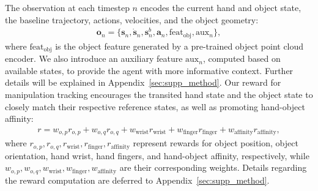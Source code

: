 The observation at each timestep $n$ encodes the current hand and object state, the baseline trajectory, actions, velocities, and the object geometry:
\begin{align}
    \mathbf{o}_n = \{ \mathbf{s}_n, \dot{\mathbf{s}}_n, \mathbf{s}^b_n, \mathbf{a}_n, \text{feat}_{\text{obj}}, \text{aux}_n \}, \label{eq_obs}
\end{align}
where \(\text{feat}_{\text{obj}}\) is the object feature generated by a pre-trained object point cloud encoder. We also introduce an auxiliary feature \(\text{aux}_n\), computed based on available states, to provide the agent with more informative context. Further details will be explained in Appendix~\ref{sec:supp_method}.
Our reward for manipulation tracking encourages the transited hand state and the object state to closely match their respective reference states, as well as promoting hand-object affinity:
\begin{align}
    r = w_{o, p} r_{o, p} + w_{o, q} r_{o, q} + w_{\text{wrist}} r_{\text{wrist}} + w_{\text{finger}} r_{\text{finger}} + w_{\text{affinity}} r_{\text{affinity}}, \label{eq_rew}
\end{align}
where \(r_{o,p}, r_{o, q}, r_{\text{wrist}}, r_{\text{finger}}, r_{\text{affinity}}\) represent rewards for object position, object orientation, hand wrist, hand fingers, and hand-object affinity, respectively, while \(w_{o, p}, w_{o, q}, w_{\text{wrist}}, w_{\text{finger}}, w_{\text{affinity}}\) are their corresponding weights. Details regarding the reward computation are deferred to Appendix~\ref{sec:supp_method}.






